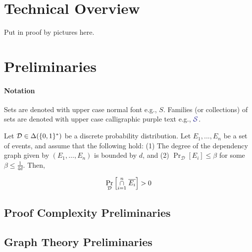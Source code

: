 \documentclass[11pt]{article}
\newcommand{\DistSet}[1]{\Delta(#1)}
\newcommand{\Dist}{\mathcal{D}}
\newcommand{\PProb}[2]{\Pr_{#2}\left[#1 \right]}
\begin{document}
\section{Technical Overview}

Put in proof by pictures here.



\section{Preliminaries}

\paragraph{Notation} Sets are denoted with upper case normal font e.g., $S$. Families (or collections) of sets are denoted with upper case calligraphic purple text e.g., $\Family{S}$. 


\begin{definition}\label{def:dep-graphs}
	
\end{definition}

\begin{lemma}\label{lemma:lll}Let $\Dist \in \DistSet{\bit^*}$ be a discrete probability distribution.
Let $E_1,...,E_n$ be a set of events, and assume that the following hold: (1) The degree of the dependency graph given by $(E_1, \dots, E_n)$ is bounded by $d$, and (2) $\PProb{E_i}{\Dist} \leq \beta$ for some $\beta \leq \frac{1}{4d}$. Then,

\[ \PProb{\overset{n}{ \underset{i=1}{\cap}} \hspace{0.1cm}  \overline{E_i}}{\Dist} > 0\]	
	
\end{lemma}

\subsection{Proof Complexity Preliminaries}
\label{sec:proof-system-prelims}
\begin{definition}\label{def:poly-calc-refutations}
	
\end{definition}

\subsection{Graph Theory Preliminaries}
\end{document}
